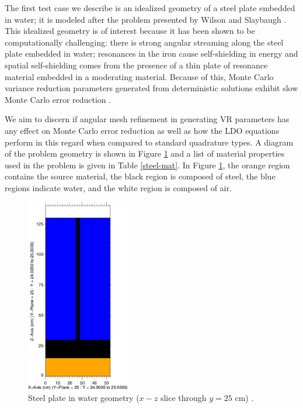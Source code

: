 \documentclass{article} %
\begin{document}
The first test case we describe is an idealized geometry of a steel plate
embedded in water; it is modeled after the problem presented by Wilson and
Slaybaugh \cite{wilsonslaybaugh}. This idealized geometry is of interest
because it has been shown to be computationally challenging: there is strong
angular streaming along the steel plate embedded in water; resonances in the
iron cause self-shielding in energy and spatial self-shielding comes from the
presence of a thin plate of resonance material embedded in a moderating
material. Because of this, Monte Carlo variance reduction parameters generated
from deterministic solutions exhibit slow Monte Carlo error reduction
\cite{wilsonslaybaugh}. 

We aim to discern if angular mesh refinement in
generating VR parameters has any effect on Monte Carlo error reduction as well
as how the LDO equations perform in this regard when compared to standard
quadrature types. A diagram of the problem geometry is shown in Figure
\ref{steelxz} and a list of material properties used in the problem is given
in Table \ref{steel-mat}. In Figure \ref{steelxz}, the orange region contains
the source material, the black region is composed of steel, the blue regions
indicate water, and the white region is composed of air.

\begin{figure}[!htb]
\centering
\includegraphics[width=0.4\textwidth]{steel-xz.png}
\caption{Steel plate in water geometry ($x-z$ slice through $y = 25$ cm) 
         \cite{wilsonslaybaugh}.}
\label{steelxz}
\end{figure}
\end{document}
